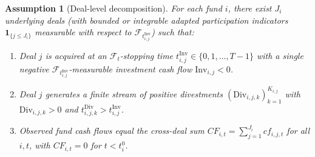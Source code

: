 \documentclass[12pt]{article}
\newtheorem{assume}{Assumption}
\begin{document}
\begin{assume}[Deal-level decomposition]
\label{ass:deal_level_dgp}
For each fund $i$, there exist $J_i$ underlying deals (with bounded or integrable adapted participation indicators $\mathbf{1}_{\{j \le J_i\}}$ measurable with respect to $\mathcal{F}_{t_{i,j}^{\mathrm{Inv}}}$) such that:
\begin{enumerate}
  \item Deal $j$ is acquired at an $\mathcal{F}_t$-stopping time $t_{i,j}^{\mathrm{Inv}} \in \{0,1,\dots,T-1\}$ with a single negative $\mathcal{F}_{t_{i,j}^{\mathrm{Inv}}}$-measurable investment cash flow $\mathrm{Inv}_{i,j} < 0$.
  \item Deal $j$ generates a finite stream of positive divestments $(\mathrm{Div}_{i,j,k})_{k=1}^{K_{i,j}}$ with $\mathrm{Div}_{i,j,k} > 0$ and $t_{i,j,k}^{\mathrm{Div}} > t_{i,j}^{\mathrm{Inv}}$.
  \item Observed fund cash flows equal the cross-deal sum $CF_{i,t} = \sum_{j=1}^{J_i} cf_{i,j,t}$ for all $i,t$, with $CF_{i,t} = 0$ for $t < t_i^0$.
\end{enumerate}
\end{assume}
\end{document}
